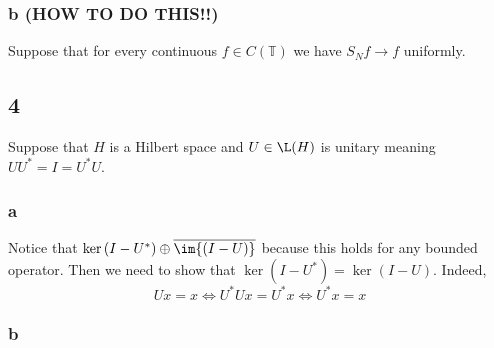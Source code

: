 \documentclass[12pt]{article}
\renewcommand{\T}{\mathbb{T}}
\begin{document}
\subsubsection{b (HOW TO DO THIS!!)}

Suppose that for every continuous $f \in C(\T)$ we have $S_N f \to f$ uniformly.


\subsection{4}

Suppose that $H$ is a Hilbert space and $U \in \L(H)$ is unitary meaning $U U^* = I = U^* U$.

\subsubsection{a}

Notice that $\ker{(I - U^*)} \oplus \overline{\im{(I - U)}}$ because this holds for any bounded operator. Then we need to show that $\ker{(I - U^*)} = \ker{(I - U)}$. Indeed,
\[ U x = x \iff U^* U x = U^* x \iff U^* x = x \]

\subsubsection{b}
\end{document}
